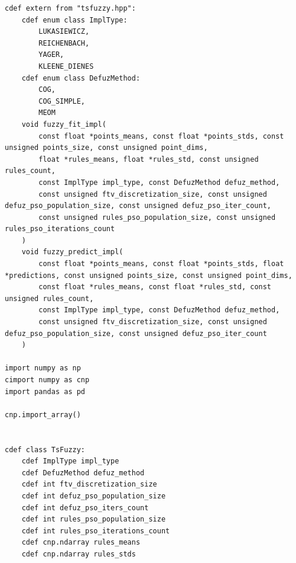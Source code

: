 \begingroup
\captiondelim{ } %
\begin{ListingEnv}
	\label{lst:cython}
\end{ListingEnv}
\begin{verbatim}
cdef extern from "tsfuzzy.hpp":
    cdef enum class ImplType:
        LUKASIEWICZ,
        REICHENBACH,
        YAGER,
        KLEENE_DIENES
    cdef enum class DefuzMethod:
        COG,
        COG_SIMPLE,
        MEOM
    void fuzzy_fit_impl(
        const float *points_means, const float *points_stds, const unsigned points_size, const unsigned point_dims,
        float *rules_means, float *rules_std, const unsigned rules_count,
        const ImplType impl_type, const DefuzMethod defuz_method,
        const unsigned ftv_discretization_size, const unsigned defuz_pso_population_size, const unsigned defuz_pso_iter_count,
        const unsigned rules_pso_population_size, const unsigned rules_pso_iterations_count
    )
    void fuzzy_predict_impl(
        const float *points_means, const float *points_stds, float *predictions, const unsigned points_size, const unsigned point_dims,
        const float *rules_means, const float *rules_std, const unsigned rules_count,
        const ImplType impl_type, const DefuzMethod defuz_method,
        const unsigned ftv_discretization_size, const unsigned defuz_pso_population_size, const unsigned defuz_pso_iter_count
    )

import numpy as np
cimport numpy as cnp
import pandas as pd

cnp.import_array()


cdef class TsFuzzy:
    cdef ImplType impl_type
    cdef DefuzMethod defuz_method
    cdef int ftv_discretization_size
    cdef int defuz_pso_population_size
    cdef int defuz_pso_iters_count
    cdef int rules_pso_population_size
    cdef int rules_pso_iterations_count
    cdef cnp.ndarray rules_means
    cdef cnp.ndarray rules_stds


\end{verbatim}
